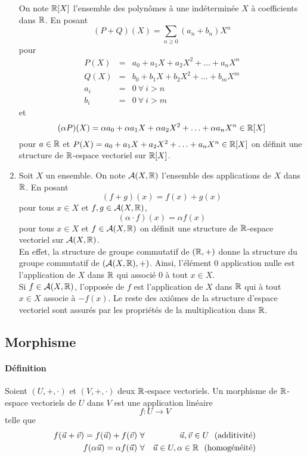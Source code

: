 \begin{enumerate}
    On note $\mathbb{R}[X]$ l'ensemble des polynômes à une indéterminée $X$ à coefficients dans $\mathbb{R}$. En posant $$(P + Q)(X) = \sum_{n \geq 0} (a_n + b_n)X^n$$ pour 
    \begin{eqnarray*}
      P(X) &=& a_0 + a_1 X + a_2 X^2 + \ldots + a_n X^{n} \\
      Q(X) &=& b_0 + b_1 X + b_2 X^2 + \ldots + b_m X^{m} \\
      a_i &=& 0 ~ \forall ~ i > n \\
      b_i &=& 0 ~ \forall ~ i > m
    \end{eqnarray*}
    et 
    $$(\alpha P)(X) = \alpha a_0 + \alpha a_1 X + \alpha a_2 X^2 + \ldots + \alpha a_n X^{n} \in \mathbb{R}[X]$$
    pour $a \in \mathbb{R}$ et $P(X) = a_0 + a_1 X + a_2 X^2 + \ldots + a_n X^{n} \in \mathbb{R}[X]$ on définit une structure de $\mathbb{R}$-espace vectoriel sur $\mathbb{R}[X]$.
  \item Soit $X$ un ensemble. On note $\mathcal{A}(X, \mathbb{R})$ l'ensemble des applications de $X$ dans $\mathbb{R}$. En posant
    $$(f + g)(x) = f(x) + g(x)$$
    pour tous $x \in X$ et $f, g \in \mathcal{A}(X, \mathbb{R})$,
    $$(\alpha \cdot f)(x) = \alpha f(x)$$
    pour tous $x \in X$ et $f \in \mathcal{A}(X, \mathbb{R})$ on définit une structure de $\mathbb{R}$-espace vectoriel sur $\mathcal{A}(X, \mathbb{R})$. \\
    
    En effet, la structure de groupe commutatif de $(\mathbb{R}, +)$ donne la structure du groupe commutatif de $(\mathcal{A}(X, \mathbb{R}), +)$. Ainsi, l'élément $0$ application nulle est l'application de $X$ dans $\mathbb{R}$ qui associé $0$ à tout $x \in X$. \\
    Si $f \in \mathcal{A}(X, \mathbb{R})$, l'opposée de $f$ est l'application de $X$ dans $\mathbb{R}$ qui à tout $x \in X$ associe à $-f(x)$. Le reste des axiômes de la structure d'espace vectoriel sont assurés par les propriétés de la multiplication dans $\mathbb{R}$.
\end{enumerate}

%
\subsection{Morphisme}
%
\paragraph{Définition} Soient $(U, +, \cdot)$ et $(V, +, \cdot)$ deux $\mathbb{R}$-espace vectoriels. Un morphisme de $\mathbb{R}$-espace vectoriels de $U$ dans $V$ est une application linéaire
  $$f: U \rightarrow V$$
  telle que
  \begin{eqnarray*}
    f(\vec{u} + \vec{v}) = f(\vec{u}) + f(\vec{v}) ~ &\forall&\vec{u}, \vec{v} \in U \mbox{~ (additivité)}\\
    f(\alpha \vec{u} ) = \alpha f(\vec{u}) ~ &\forall&\vec{u} \in U, \alpha \in \mathbb{R} \mbox{~ (homogénéité)}
  \end{eqnarray*}

